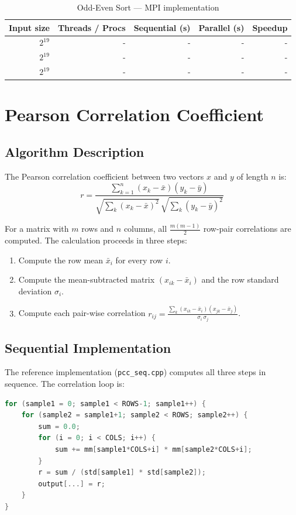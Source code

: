 \documentclass[11pt,a4paper]{article}
\begin{document}
\begin{table}[h]
\centering
\begin{tabular}{|r|r|r|r|r|}
\hline
\textbf{Input size} & \textbf{Threads / Procs} & \textbf{Sequential (s)} & \textbf{Parallel (s)} & \textbf{Speedup} \\
\hline
$2^{19}$ & - & - & - & - \\
$2^{19}$ & - & - & - & - \\
$2^{19}$ & - & - & - & - \\
\hline
\end{tabular}
\caption{Odd-Even Sort --- MPI implementation}
\end{table}

\section{Pearson Correlation Coefficient}

\subsection{Algorithm Description}

The Pearson correlation coefficient between two vectors $x$ and $y$ of length $n$ is:
$$r = \frac{\sum_{k=1}^{n}(x_k - \bar{x})(y_k - \bar{y})}{\sqrt{\sum_{k}(x_k-\bar{x})^2}\,\sqrt{\sum_{k}(y_k-\bar{y})^2}}$$

For a matrix with $m$ rows and $n$ columns, all $\frac{m(m-1)}{2}$ row-pair correlations are
computed. The calculation proceeds in three steps:
\begin{enumerate}
    \item Compute the row mean $\bar{x}_i$ for every row $i$.
    \item Compute the mean-subtracted matrix $(x_{ik} - \bar{x}_i)$ and the row standard
          deviation $\sigma_i$.
    \item Compute each pair-wise correlation
          $r_{ij} = \frac{\sum_k (x_{ik}-\bar{x}_i)(x_{jk}-\bar{x}_j)}{\sigma_i\,\sigma_j}$.
\end{enumerate}

\subsection{Sequential Implementation}

The reference implementation (\texttt{pcc\_seq.cpp}) computes all three steps in sequence. The
correlation loop is:

\begin{lstlisting}[language=C++, caption=Sequential PCC correlation loop]
for (sample1 = 0; sample1 < ROWS-1; sample1++) {
    for (sample2 = sample1+1; sample2 < ROWS; sample2++) {
        sum = 0.0;
        for (i = 0; i < COLS; i++) {
            sum += mm[sample1*COLS+i] * mm[sample2*COLS+i];
        }
        r = sum / (std[sample1] * std[sample2]);
        output[...] = r;
    }
}
\end{lstlisting}
\end{document}
